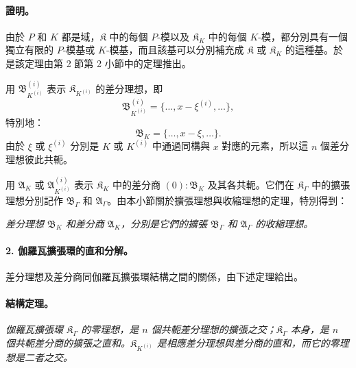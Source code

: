 \documentclass[11pt]{article}
\begin{document}
\paragraph{證明。}
由於 $P$ 和 $K$ 都是域，$\mathfrak K$ 中的每個 $P$-模以及 $\mathfrak K_K$ 中的每個 $K$-模，都分別具有一個獨立有限的 $P$-模基或 $K$-模基，而且該基可以分別補充成 $\mathfrak K$ 或 $\mathfrak K_K$ 的這種基。於是該定理由第 2 節第 2 小節中的定理推出。

用 $\mathfrak B_{K^{(i)}}^{(i)}$ 表示 $\mathfrak K_{K^{(i)}}$ 的差分理想，即
\[
\mathfrak B_{K^{(i)}}^{(i)}=\{\ldots,x-\xi^{(i)},\ldots\},
\]
特別地：
\[
\mathfrak B_K=\{\ldots,x-\xi,\ldots\}.
\]
由於 $\xi$ 或 $\xi^{(i)}$ 分別是 $K$ 或 $K^{(i)}$ 中通過同構與 $x$ 對應的元素，所以這 $n$ 個差分理想彼此共軛。

用 $\mathfrak A_K$ 或 $\mathfrak A_{K^{(i)}}^{(i)}$ 表示 $\mathfrak K_K$ 中的差分商 $(0):\mathfrak B_K$ 及其各共軛。它們在 $\mathfrak K_\Gamma$ 中的擴張理想分別記作 $\mathfrak B_\Gamma$ 和 $\mathfrak A_\Gamma$。由本小節關於擴張理想與收縮理想的定理，特別得到：

\emph{差分理想 $\mathfrak B_K$ 和差分商 $\mathfrak A_K$，分別是它們的擴張 $\mathfrak B_\Gamma$ 和 $\mathfrak A_\Gamma$ 的收縮理想。}

\paragraph{2. 伽羅瓦擴張環的直和分解。}
差分理想及差分商同伽羅瓦擴張環結構之間的關係，由下述定理給出。

\paragraph{結構定理。}
\emph{伽羅瓦擴張環 $\mathfrak K_\Gamma$ 的零理想，是 $n$ 個共軛差分理想的擴張之交；$\mathfrak K_\Gamma$ 本身，是 $n$ 個共軛差分商的擴張之直和。$\mathfrak K_{K^{(i)}}$ 是相應差分理想與差分商的直和，而它的零理想是二者之交。}
\end{document}
